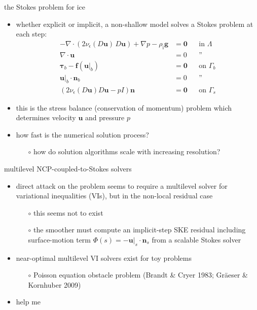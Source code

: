 \documentclass[svgnames,
               hyperref={colorlinks,citecolor=DeepPink4,linkcolor=FireBrick,urlcolor=Maroon},
               usepdftitle=false]  %
               {beamer}
\newcommand{\eps}{\epsilon}
\newcommand{\bbf}{\mathbf{f}}
\newcommand{\bn}{\mathbf{n}}
\newcommand{\bu}{\mathbf{u}}
\newcommand{\btau}{\bm{\tau}}
\newcommand{\bzero}{\bm{0}}
\newcommand{\rhoi}{\rho_{\text{i}}}
\begin{document}
\begin{frame}{the Stokes problem for ice}

\begin{itemize}
\item whether explicit or implicit, a non-shallow model solves a Stokes problem at each step:
\begin{align*}
- \nabla \cdot \left(2 \nu_\eps(D\bu)\, D\bu\right) + \nabla p - \rhoi \mathbf{g} &= \bzero && \text{in $\Lambda$} \\
\nabla \cdot \bu &= 0 && \text{''} \\
\btau_b - \bbf(\bu|_b) &= \bzero && \text{on $\Gamma_b$} \\
\bu|_b \cdot \bn_b &= 0 && \text{''} \\
\left(2 \nu_\eps(D\bu) D\bu - pI\right) \bn &= \bzero && \text{on $\Gamma_s$}
\end{align*}
\item this is the \alert{stress balance} (conservation of momentum) problem which determines velocity $\bu$ and pressure $p$
\item how fast is the numerical solution process?
    \begin{itemize}
    \item[$\circ$] how do solution algorithms \alert{scale with increasing resolution}?
    \end{itemize}
\end{itemize}
\end{frame}




\begin{frame}{multilevel NCP-coupled-to-Stokes solvers}

\begin{itemize}
\item direct attack on the problem seems to require a \alert{multilevel} solver for \alert{variational inequalities} (VIs), but in the \alert{non-local residual case}
    \begin{itemize}
    \item[$\circ$] this seems not to exist
    \item[$\circ$] the \alert{smoother} must compute an implicit-step SKE residual including surface-motion term $\Phi(s) = - \bu|_s\cdot \bn_s$ from a scalable Stokes solver
    \end{itemize}
\item near-optimal multilevel VI solvers exist for toy problems
    \begin{itemize}
    \item[$\circ$] Poisson equation obstacle problem (Brandt \& Cryer 1983; Gr\"aeser \& Kornhuber 2009)
    \end{itemize}
\item<2> \alert{help me}
\end{itemize}
\end{frame}
\end{document}
